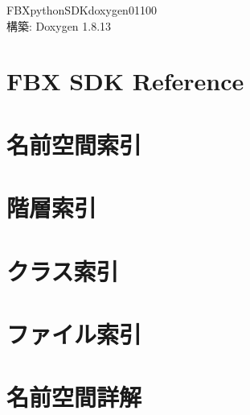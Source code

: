\documentclass[twoside]{book}
\newcommand{\+}{\discretionary{\mbox{\scriptsize$\hookleftarrow$}}{}{}}
\newcommand{\clearemptydoublepage}{%
  \newpage{\pagestyle{empty}\cleardoublepage}%
}
\begin{document}
\hypersetup{pageanchor=false,
             bookmarksnumbered=true,
             pdfencoding=unicode
            }
\begin{titlepage}
\vspace*{7cm}
\begin{center}%
{\Large F\+B\+Xpython\+S\+D\+Kdoxygen01100 }\\
\vspace*{1cm}
{\large 構築\+: Doxygen 1.8.13}\\
\end{center}
\end{titlepage}
\clearemptydoublepage
{}
\tableofcontents
\clearemptydoublepage
{}
\hypersetup{pageanchor=true}

\chapter{F\+BX S\+DK Reference}
\label{index}\hypertarget{index}{}
\chapter{名前空間索引}

\chapter{階層索引}

\chapter{クラス索引}

\chapter{ファイル索引}

\chapter{名前空間詳解}





























\end{document}
